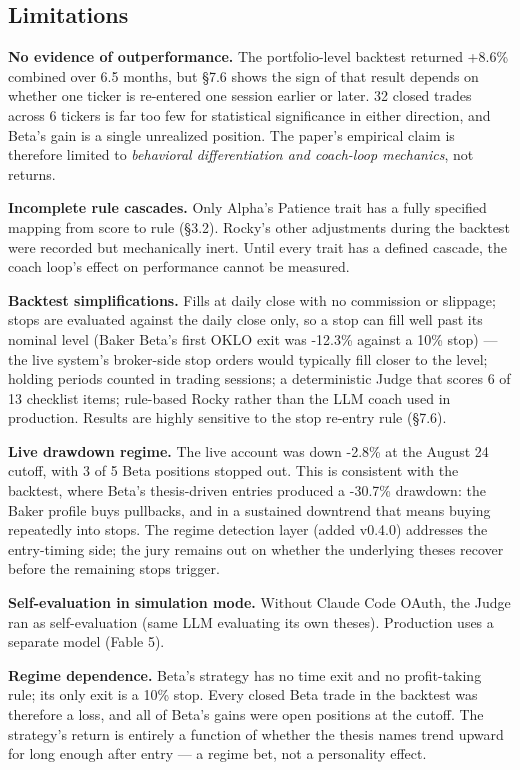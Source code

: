 \documentclass[11pt]{article}
\begin{document}
\subsection{Limitations}\label{limitations}

\textbf{No evidence of outperformance.} The portfolio-level backtest returned +8.6\% combined over 6.5 months, but §7.6 shows the sign of that result depends on whether one ticker is re-entered one session earlier or later. 32 closed trades across 6 tickers is far too few for statistical significance in either direction, and Beta's gain is a single unrealized position. The paper's empirical claim is therefore limited to \emph{behavioral differentiation and coach-loop mechanics}, not returns.

\textbf{Incomplete rule cascades.} Only Alpha's Patience trait has a fully specified mapping from score to rule (§3.2). Rocky's other adjustments during the backtest were recorded but mechanically inert. Until every trait has a defined cascade, the coach loop's effect on performance cannot be measured.

\textbf{Backtest simplifications.} Fills at daily close with no commission or slippage; stops are evaluated against the daily close only, so a stop can fill well past its nominal level (Baker Beta's first OKLO exit was -12.3\% against a 10\% stop) --- the live system's broker-side stop orders would typically fill closer to the level; holding periods counted in trading sessions; a deterministic Judge that scores 6 of 13 checklist items; rule-based Rocky rather than the LLM coach used in production. Results are highly sensitive to the stop re-entry rule (§7.6).

\textbf{Live drawdown regime.} The live account was down -2.8\% at the August 24 cutoff, with 3 of 5 Beta positions stopped out. This is consistent with the backtest, where Beta's thesis-driven entries produced a -30.7\% drawdown: the Baker profile buys pullbacks, and in a sustained downtrend that means buying repeatedly into stops. The regime detection layer (added v0.4.0) addresses the entry-timing side; the jury remains out on whether the underlying theses recover before the remaining stops trigger.

\textbf{Self-evaluation in simulation mode.} Without Claude Code OAuth, the Judge ran as self-evaluation (same LLM evaluating its own theses). Production uses a separate model (Fable 5).

\textbf{Regime dependence.} Beta's strategy has no time exit and no profit-taking rule; its only exit is a 10\% stop. Every closed Beta trade in the backtest was therefore a loss, and all of Beta's gains were open positions at the cutoff. The strategy's return is entirely a function of whether the thesis names trend upward for long enough after entry --- a regime bet, not a personality effect.
\end{document}
